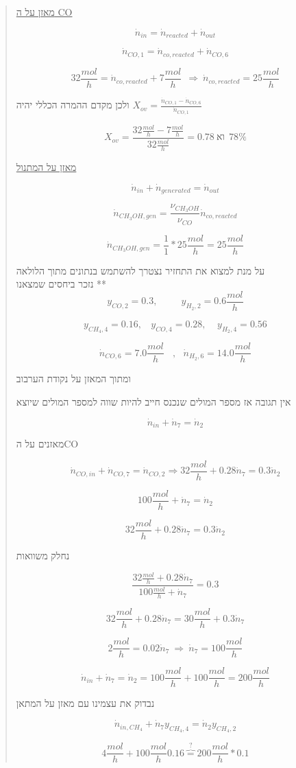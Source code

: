 \documentclass[
  hebrew,
  letterpaper,
  DIV=11,
  numbers=noendperiod]{scrreprt}
\begin{document}
\begin{quote}
\ul{מאזן על ה CO}

\[{\dot{n}}_{in} = {\dot{n}}_{reacted} + {\dot{n}}_{out}\]

\[{\dot{n}}_{CO,1} = {\dot{n}}_{co,reacted} + {\dot{n}}_{CO,6}\]

\[32\frac{mol}{h} = {\dot{n}}_{co,reacted} + 7\frac{mol}{h}\ \  \Rightarrow \ {\dot{n}}_{co,reacted} = 25\frac{mol}{h}\]

ולכן מקדם ההמרה הכללי יהיה
\(X_{ov} = \frac{{\dot{n}}_{CO,1} - {\dot{n}}_{CO,6}}{{\dot{n}}_{CO,1}}\)

\[X_{ov} = \frac{32\frac{mol}{h} - 7\frac{mol}{h}}{32\frac{mol}{h}} = 0.78\ או\ \ 78\%\]

\ul{מאזן על המתנול}

\[{\dot{n}}_{in} + {\dot{n}}_{generated} = {\dot{n}}_{out}\]

\[{\dot{n}}_{CH_{3}OH,gen} = \frac{\nu_{CH_{3}OH}}{\nu_{CO}}{\dot{n}}_{co,reacted}\]

\[{\dot{n}}_{CH_{3}OH,gen} = \frac{1}{1}*25\frac{mol}{h} = 25\frac{mol}{h}\]

על מנת למצוא את התחזיר נצטרך להשתמש בנתונים מתוך הלולאה\\
נזכר ביחסים שמצאנו **
\[y_{CO,2}^{} = 0.3,\ \ \ \ \ \ \ \ \ \ \ y_{H_{2},2}^{} = 0.6\frac{mol}{h}\]

\[y_{CH_{4},4} = 0.16,\ \ \ \ y_{CO,4} = 0.28,\ \ \ \ \ y_{H_{2},4} = 0.56\]

\[{\dot{n}}_{CO,6} = 7.0\frac{mol}{h}\ \ \ \ ,\ \ \ {\dot{n}}_{H_{2},6} = 14.0\frac{mol}{h}\]

ומתוך המאזן על נקודת הערבוב

אין תגובה אז מספר המולים שנכנס חייב להיות שווה למספר המולים שיוצא

\[{\dot{n}}_{in} + {\dot{n}}_{7} = {\dot{n}}_{2}\]

מאזנים על הCO

\[{\dot{n}}_{CO,in} + {\dot{n}}_{CO,7} = {\dot{n}}_{CO,2} \Rightarrow 32\frac{mol}{h} + 0.28{\dot{n}}_{7} = 0.3{\dot{n}}_{2}\]

\[100\frac{mol}{h} + {\dot{n}}_{7} = {\dot{n}}_{2}\]

\[32\frac{mol}{h} + 0.28{\dot{n}}_{7} = 0.3{\dot{n}}_{2}\]

נחלק משוואות

\[\frac{32\frac{mol}{h} + 0.28{\dot{n}}_{7}}{100\frac{mol}{h} + {\dot{n}}_{7}} = 0.3\]

\[32\frac{mol}{h} + 0.28{\dot{n}}_{7} = 30\frac{mol}{h} + 0.3{\dot{n}}_{7}\]

\[2\frac{mol}{h} = 0.02{\dot{n}}_{7}\  \Rightarrow \ {\dot{n}}_{7} = 100\frac{mol}{h}\]

\[{\dot{n}}_{in} + {\dot{n}}_{7} = {\dot{n}}_{2} = 100\frac{mol}{h} + 100\frac{mol}{h} = 200\frac{mol}{h}\]

נבדוק את עצמינו עם מאזן על המתאן

\[{\dot{n}}_{in,CH_{4}} + {\dot{n}}_{7}y_{CH_{4},4} = {\dot{n}}_{2}y_{CH_{4},2}\]

\[4\frac{mol}{h} + 100\frac{mol}{h}0.16\overset{?}{\overbrace{=}}200\frac{mol}{h}*0.1\]
\end{quote}
\end{document}
